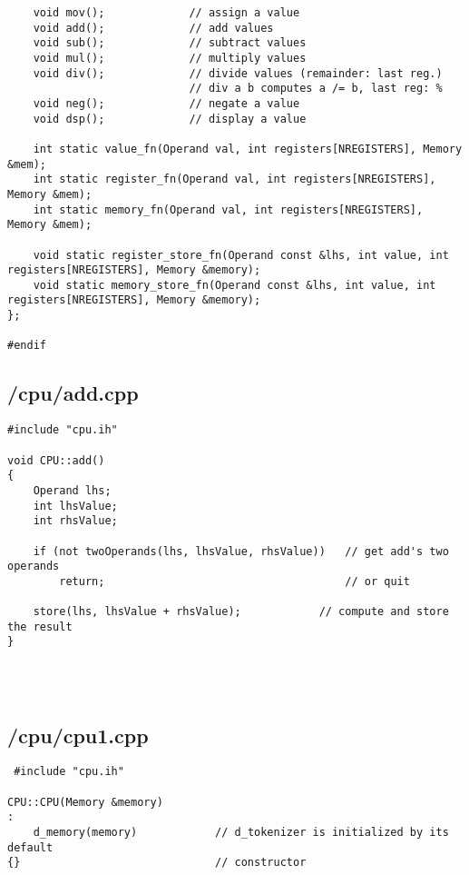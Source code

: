 \documentclass{article}
\begin{document}
\begin{verbatim}
    void mov();             // assign a value
    void add();             // add values
    void sub();             // subtract values
    void mul();             // multiply values
    void div();             // divide values (remainder: last reg.)
                            // div a b computes a /= b, last reg: %
    void neg();             // negate a value
    void dsp();             // display a value

    int static value_fn(Operand val, int registers[NREGISTERS], Memory &mem);
    int static register_fn(Operand val, int registers[NREGISTERS], Memory &mem);
    int static memory_fn(Operand val, int registers[NREGISTERS], Memory &mem);

    void static register_store_fn(Operand const &lhs, int value, int registers[NREGISTERS], Memory &memory);
    void static memory_store_fn(Operand const &lhs, int value, int registers[NREGISTERS], Memory &memory);
};
        
#endif
\end{verbatim}
\subsection*{/cpu/add.cpp}
\begin{verbatim}
#include "cpu.ih"

void CPU::add()
{
    Operand lhs;
    int lhsValue;
    int rhsValue;

    if (not twoOperands(lhs, lhsValue, rhsValue))   // get add's two operands
        return;                                     // or quit

    store(lhs, lhsValue + rhsValue);            // compute and store the result
}




\end{verbatim}
\subsection*{/cpu/cpu1.cpp}
\begin{verbatim}
 #include "cpu.ih"

CPU::CPU(Memory &memory)
:
    d_memory(memory)            // d_tokenizer is initialized by its default
{}                              // constructor
\end{verbatim}
\end{document}
